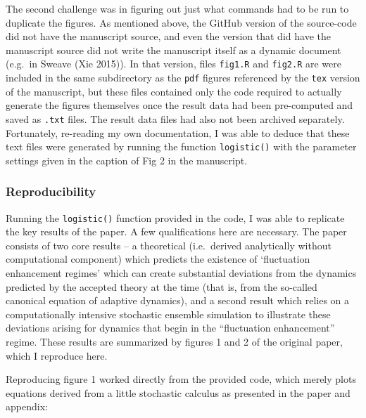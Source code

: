 \documentclass[
]{rescience}
\begin{document}
The second challenge was in figuring out just what commands had to be
run to duplicate the figures. As mentioned above, the GitHub version of
the source-code did not have the manuscript source, and even the version
that did have the manuscript source did not write the manuscript itself
as a dynamic document (e.g.~in Sweave (Xie 2015)). In that version,
files \texttt{fig1.R} and \texttt{fig2.R} are were included in the same
subdirectory as the \texttt{pdf} figures referenced by the \texttt{tex}
version of the manuscript, but these files
contained only the code required to actually generate the figures
themselves once the result data had been pre-computed and saved as
\texttt{.txt} files. The result data files had also not been archived
separately. Fortunately, re-reading my own documentation, I was able to
deduce that these text files were generated by running the function
\texttt{logistic()} with the parameter settings given in the caption of
Fig 2 in the manuscript.

\hypertarget{reproducibility}{%
\subsubsection{Reproducibility}\label{reproducibility}}

Running the \texttt{logistic()} function provided in the code, I was
able to replicate the key results of the paper. A few qualifications
here are necessary. The paper consists of two core results -- a
theoretical (i.e.~derived analytically without computational component)
which predicts the existence of `fluctuation enhancement regimes' which
can create substantial deviations from the dynamics predicted by the
accepted theory at the time (that is, from the so-called canonical
equation of adaptive dynamics), and a second result which relies on a
computationally intensive stochastic ensemble simulation to illustrate
these deviations arising for dynamics that begin in the ``fluctuation
enhancement'' regime. These results are summarized by figures 1 and 2 of
the original paper, which I reproduce here.

Reproducing figure 1 worked directly from the provided code, which
merely plots equations derived from a little stochastic calculus as
presented in the paper and appendix:
\end{document}
